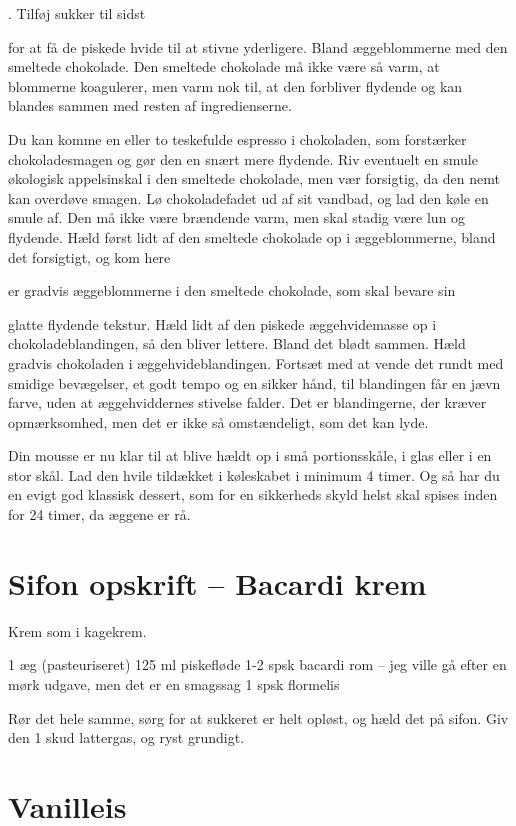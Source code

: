 \documentclass[
  letterpaper,
  DIV=11,
  numbers=noendperiod]{scrreprt}
\begin{document}
. Tilføj sukker til sidst

for at få de piskede hvide til at stivne yderligere. Bland æggeblommerne
med den smeltede chokolade. Den smeltede chokolade må ikke være så varm,
at blommerne koagulerer, men varm nok til, at den forbliver flydende og
kan blandes sammen med resten af ingredienserne.

Du kan komme en eller to teskefulde espresso i chokoladen, som
forstærker chokoladesmagen og gør den en snært mere flydende. Riv
eventuelt en smule økologisk appelsinskal i den smeltede chokolade, men
vær forsigtig, da den nemt kan overdøve smagen. Lø chokoladefadet ud af
sit vandbad, og lad den køle en smule af. Den må ikke være brændende
varm, men skal stadig være lun og flydende. Hæld først lidt af den
smeltede chokolade op i æggeblommerne, bland det forsigtigt, og kom here

er gradvis æggeblommerne i den smeltede chokolade, som skal bevare sin

glatte flydende tekstur. Hæld lidt af den piskede æggehvidemasse op i
chokoladeblandingen, så den bliver lettere. Bland det blødt sammen. Hæld
gradvis chokoladen i æggehvideblandingen. Fortsæt med at vende det rundt
med smidige bevægelser, et godt tempo og en sikker hånd, til blandingen
får en jævn farve, uden at æggehviddernes stivelse falder. Det er
blandingerne, der kræver opmærksomhed, men det er ikke så omstændeligt,
som det kan lyde.

Din mousse er nu klar til at blive hældt op i små portionsskåle, i glas
eller i en stor skål. Lad den hvile tildækket i køleskabet i minimum 4
timer. Og så har du en evigt god klassisk dessert, som for en sikkerheds
skyld helst skal spises inden for 24 timer, da æggene er rå.

\hypertarget{sifon-opskrift-bacardi-krem}{%
\section{Sifon opskrift -- Bacardi
krem}\label{sifon-opskrift-bacardi-krem}}

Krem som i kagekrem.

1 æg (pasteuriseret) 125 ml piskefløde 1-2 spsk bacardi rom -- jeg ville
gå efter en mørk udgave, men det er en smagssag 1 spsk flormelis

Rør det hele samme, sørg for at sukkeret er helt opløst, og hæld det på
sifon. Giv den 1 skud lattergas, og ryst grundigt.

\hypertarget{vanilleis}{%
\section{Vanilleis}\label{vanilleis}}
\end{document}
